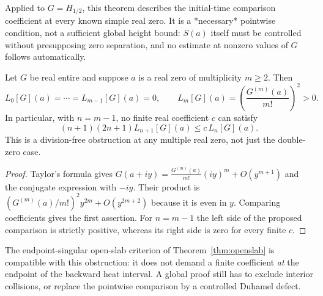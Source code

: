 Applied to $G=H_{1/2}$, this theorem describes the
initial-time comparison coefficient at every known simple
real zero. It is a *necessary* pointwise condition,
not a sufficient global height bound: $S(a)$ itself
must be controlled without presupposing zero separation,
and no estimate at nonzero values of $G$ follows
automatically.

\begin{theorem}
\label{thm:multizero}
Let $G$ be real entire and suppose $a$ is a real zero
of multiplicity $m\ge2$. Then
\[
L_0[G](a)=\cdots=L_{m-1}[G](a)=0,
\qquad
\boxed{L_m[G](a)=
\left(\frac{G^{(m)}(a)}{m!}\right)^2>0.}
\]
In particular, with $n=m-1$, no finite real
coefficient $c$ can satisfy
\[
(n+1)(2n+1)L_{n+1}[G](a)
\le c\,L_n[G](a).
\]
This is a division-free obstruction at any multiple
real zero, not just the double-zero case.
\end{theorem}
\begin{proof}
Taylor's formula gives
$G(a+iy)=\frac{G^{(m)}(a)}{m!}(iy)^m+O(y^{m+1})$
and the conjugate expression with $-iy$.
Their product is
$\left(G^{(m)}(a)/m!\right)^2y^{2m}
+O(y^{2m+2})$ because it is even in $y$.
Comparing coefficients gives the first assertion.
For $n=m-1$ the left side of the proposed
comparison is strictly positive, whereas its
right side is zero for every finite $c$.
\end{proof}
The endpoint-singular open-slab criterion of
Theorem~\ref{thm:openslab} is compatible with this
obstruction: it does not demand a finite coefficient
\emph{at} the endpoint of the backward heat interval.
A global proof still has to exclude interior collisions,
or replace the pointwise comparison by a controlled
Duhamel defect.

